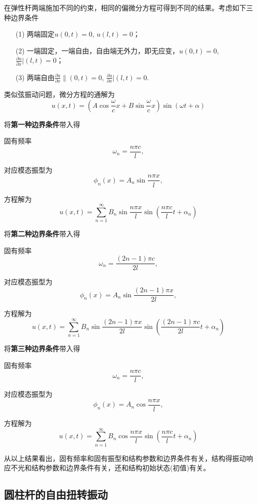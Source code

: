 在弹性杆两端施加不同的约束，相同的偏微分方程可得到不同的结果。考虑如下三种边界条件
\begin{enumerate}
    \item[(1)]两端固定$u(0,t)=0$, $u(l,t)=0$；
    \item[(2)]一端固定，一端自由，自由端无外力，即无应变，$u(0,t)=0$, $\frac{\partial u}{\partial x}|(l,t)=0$；
    \item[(3)]两端自由$\frac{\partial u}{\partial x}\|(0,t)=0$, $\frac{\partial u}{\partial x}|(l,t)=0$.
\end{enumerate}

类似弦振动问题，微分方程的通解为
\begin{equation}
    u(x,t)=\left(A\cos \frac{\omega}{c}x + B\sin \frac{\omega}{c}x\right)\sin\left(\omega t + \alpha\right)
\end{equation}

\noindent 将\textbf{第一种边界条件}带入得

固有频率$$\omega_{n}=\frac{n\pi c}{l},$$

对应模态振型为$$\phi_{n}(x)=A_{n}\sin \frac{n\pi x}{l},$$

方程解为$$u(x,t)=\sum\limits_{n=1}^{\infty}B_{n}\sin\frac{n\pi x}{l}\sin \left(\frac{n\pi c}{l}t+\alpha_{n}\right)$$

\noindent 将\textbf{第二种边界条件}带入得

固有频率$$\omega_{n}=\frac{(2n-1)\pi c}{2l},$$

对应模态振型为$$\phi_{n}(x)=A_{n}\sin \frac{(2n-1)\pi x}{2l},$$

方程解为$$u(x,t)=\sum\limits_{n=1}^{\infty}B_{n}\sin\frac{(2n-1)\pi x}{2l}\sin \left(\frac{(2n-1)\pi c}{2l}t+\alpha_{n}\right)$$

\noindent 将\textbf{第三种边界条件}带入得

固有频率$$\omega_{n}=\frac{n\pi c}{l},$$

对应模态振型为$$\phi_{n}(x)=A_{n}\cos \frac{n\pi x}{l},$$

方程解为$$u(x,t)=\sum\limits_{n=1}^{\infty}B_{n}\cos\frac{n\pi x}{l}\sin \left(\frac{n\pi c}{l}t+\alpha_{n}\right)$$

从以上结果看出，固有频率和固有振型和结构参数和边界条件有关，结构得振动响应不光和结构参数和边界条件有关，还和结构初始状态(初值)有关。


\subsection{圆柱杆的自由扭转振动}

